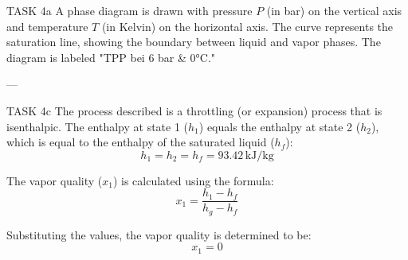 TASK 4a  
A phase diagram is drawn with pressure \( P \) (in bar) on the vertical axis and temperature \( T \) (in Kelvin) on the horizontal axis. The curve represents the saturation line, showing the boundary between liquid and vapor phases. The diagram is labeled "TPP bei 6 bar & 0°C."

---

TASK 4c  
The process described is a throttling (or expansion) process that is isenthalpic. The enthalpy at state 1 (\( h_1 \)) equals the enthalpy at state 2 (\( h_2 \)), which is equal to the enthalpy of the saturated liquid (\( h_f \)):  
\[
h_1 = h_2 = h_f = 93.42 \, \text{kJ/kg}
\]

The vapor quality (\( x_1 \)) is calculated using the formula:  
\[
x_1 = \frac{h_1 - h_f}{h_g - h_f}
\]

Substituting the values, the vapor quality is determined to be:  
\[
x_1 = 0
\]